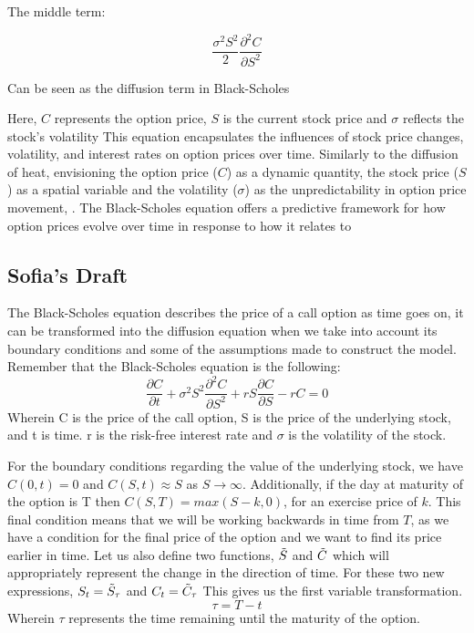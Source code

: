 \documentclass[11pt]{article}
\begin{document}
The middle term:

\[\frac{\sigma^2S^2}{2} \frac{\partial^2 C}{\partial S^2} \]

Can be seen as the diffusion term in Black-Scholes

Here, \(C\) represents the option price, \(S\) is the current stock price and \(\sigma\) reflects the stock's volatility This equation encapsulates the influences of stock price changes, volatility, and interest rates on option prices over time. Similarly to the diffusion of heat, envisioning the option price (\(C\)) as a dynamic quantity, the stock price (\(S\)) as a spatial variable and the volatility (\(\sigma\)) as the unpredictability in option price movement, . The Black-Scholes equation offers a predictive framework for how option prices evolve over time in response to how it relates to

\newpage


\subsection{Sofia's Draft}
The Black-Scholes equation describes the price of a call option as time goes on, it can be transformed into the diffusion equation when we take into account its boundary conditions and some of the assumptions made to construct the model. Remember that the Black-Scholes equation is the following:
\[\frac{\partial C}{\partial t} + \sigma^2 S^2 \frac{\partial^2 C}{\partial S^2} + rS \frac{\partial C}{\partial S} - rC = 0
\]
Wherein C is the price of the call option, S is the price of the underlying stock, and t is time. r is the risk-free interest rate and $\sigma $ is the volatility of the stock.

For the boundary conditions regarding the value of the underlying stock, we have $C(0,t)=0$ and $C(S,t)\approx S$ as $S \rightarrow \infty$. Additionally, if the day at maturity of the option is T then $C(S,T)=max(S-k,0)$, for an exercise price of $k$. This final condition means that we will be working backwards in time from $T$, as we have a condition for the final price of the option and we want to find its price earlier in time. Let us also define two functions, $\Tilde{S}$ and $\Tilde{C}$ which will appropriately represent the change in the direction of time. For these two new expressions, $S_t = \Tilde{S}_\tau$ and $C_t = \Tilde{C}_\tau$
This gives us the first variable transformation.
\[
\tau = T - t
\] Wherein $\tau$ represents the time remaining until the maturity of the option.
\end{document}
